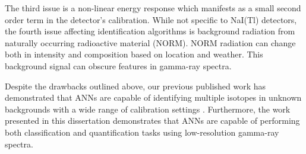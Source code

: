 The third issue is a non-linear energy response which manifests as a small second order term in the detector's calibration. While not specific to NaI(Tl) detectors, the fourth issue affecting identification algorithms is background radiation from naturally occurring radioactive material (NORM). NORM radiation can change both in intensity and composition based on location and weather. This background signal can obscure features in gamma-ray spectra.

Despite the drawbacks outlined above, our previous published work has demonstrated that ANNs are capable of identifying multiple isotopes in unknown backgrounds with a wide range of calibration settings \cite{kamudaThesis2017, kamuda2017, kamuda2018}. Furthermore, the work presented in this dissertation demonstrates that ANNs are capable of performing both classification and quantification tasks using low-resolution gamma-ray spectra.










